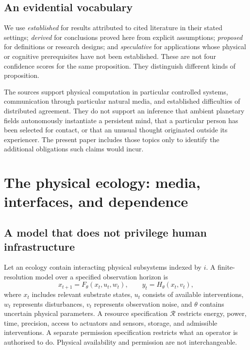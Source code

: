 \documentclass[11pt,a4paper]{article}
\theoremstyle{definition}
\theoremstyle{remark}
\newcommand{\calR}{\mathcal{R}}
\begin{document}
\subsection{An evidential vocabulary}
We use \emph{established} for results attributed to cited literature in their stated settings; \emph{derived} for conclusions proved here from explicit assumptions; \emph{proposed} for definitions or research designs; and \emph{speculative} for applications whose physical or cognitive prerequisites have not been established. These are not four confidence scores for the same proposition. They distinguish different kinds of proposition.

The sources support physical computation in particular controlled systems, communication through particular natural media, and established difficulties of distributed agreement. They do not support an inference that ambient planetary fields autonomously instantiate a persistent mind, that a particular person has been selected for contact, or that an unusual thought originated outside its experiencer. The present paper includes those topics only to identify the additional obligations such claims would incur.



\section{The physical ecology: media, interfaces, and dependence}\label{sec:ecology}
\subsection{A model that does not privilege human infrastructure}
Let an ecology contain interacting physical subsystems indexed by $i$. A finite-resolution model over a specified observation horizon is
\begin{equation}\label{eq:ecology}
 x_{t+1}=F_\theta(x_t,u_t,w_t),\qquad y_t=H_\theta(x_t,v_t),
\end{equation}
where $x_t$ includes relevant substrate states, $u_t$ consists of available interventions, $w_t$ represents disturbances, $v_t$ represents observation noise, and $\theta$ contains uncertain physical parameters. A resource specification $\calR$ restricts energy, power, time, precision, access to actuators and sensors, storage, and admissible interventions. A separate permission specification restricts what an operator is authorised to do. Physical availability and permission are not interchangeable.
\end{document}
